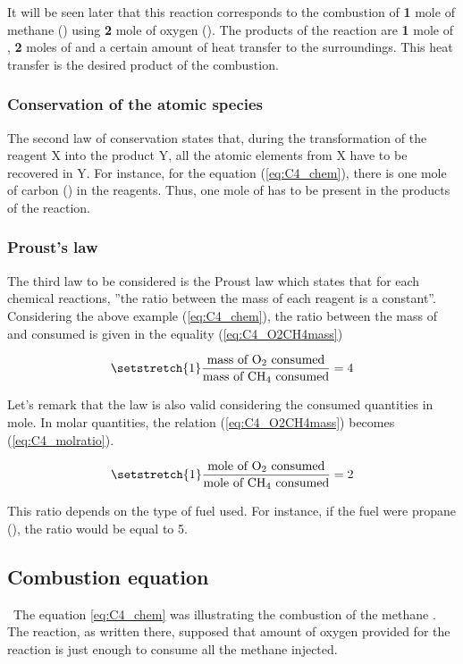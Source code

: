 It will be seen later that this reaction corresponds to the combustion of \textbf{1} mole of methane () using \textbf{2} mole of oxygen (). The products of the reaction are \textbf{1} mole of , \textbf{2} moles of  and a certain amount of heat transfer to the surroundings. This heat transfer is the desired product of the combustion.

\subsubsection{Conservation of the atomic species}
The second law of conservation states that, during the transformation of the reagent X into the product Y, all the atomic elements from X have to be recovered in Y. For instance, for the equation (\ref{eq:C4_chem}), there is one mole of carbon () in the reagents. Thus, one mole of  has to be present in the products of the reaction.
\newpage
\subsubsection{Proust's law}
The third law to be considered is the Proust law which states that for each chemical reactions, ''the ratio between the mass of each reagent is a constant''. Considering the above example (\ref{eq:C4_chem}), the ratio between the mass of  and  consumed is given in the equality (\ref{eq:C4_O2CH4mass})

\begin{equation}
    \setstretch{1}
    \frac{\text{mass of \ce{O2} consumed}}{\text{mass of \ce{CH4} consumed}} = 4 \label{eq:C4_O2CH4mass}
\end{equation}

Let's remark that the law is also valid considering the consumed quantities in mole. In molar quantities, the relation (\ref{eq:C4_O2CH4mass}) becomes (\ref{eq:C4_molratio}).

\begin{equation}
    \setstretch{1}
    \frac{\text{mole of \ce{O2} consumed}}{\text{mole of \ce{CH4} consumed}} = 2  \label{eq:C4_molratio}
\end{equation}

This ratio depends on the type of fuel used. For instance, if the fuel were propane (), the ratio would be equal to 5.

\subsection{Combustion equation}
\quad\ The equation \ref{eq:C4_chem} was illustrating the combustion of the methane . The reaction, as written there, supposed that amount of oxygen provided for the reaction is just enough to consume all the methane injected.


